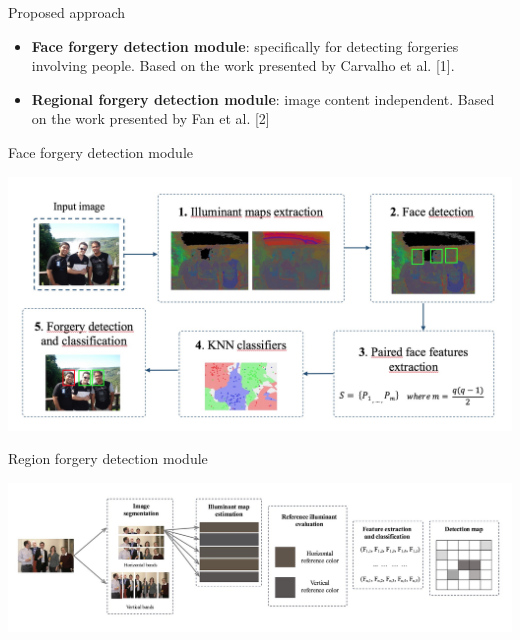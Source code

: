 \begin{tframe}{Proposed approach}

\begin{itemize}
\item \textbf{Face forgery detection module}: specifically for detecting forgeries involving people. Based on the work presented by Carvalho et al. [1].

\item \textbf{Regional forgery detection module}: image content independent. Based on the work presented by Fan et al. [2]
\end{itemize}

\end{tframe}

\begin{tframe}{Face forgery detection module}

\begin{center}
\includegraphics[width=1\textwidth]{images/pipeline_faces.jpg}
\end{center}
\end{tframe}


\begin{tframe}{Region forgery detection module}
\begin{center}
\includegraphics[width=1\textwidth]{images/pipeline_regions.jpg}
\end{center}
\end{tframe}

